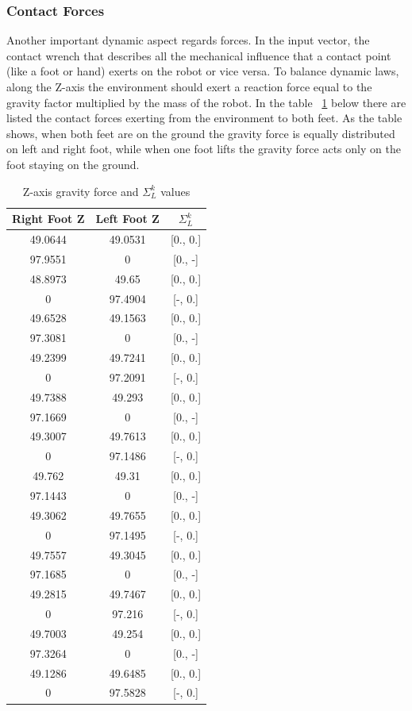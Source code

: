 \documentclass[main.tex]{subfiles}
\begin{document}
\subsubsection{Contact Forces}
Another important dynamic aspect regards forces. 
In the input vector, the contact wrench that describes all the mechanical influence that a contact point (like a foot or hand) exerts on the robot or vice versa.
To balance dynamic laws, along the Z-axis the environment should exert a reaction force equal to the gravity factor multiplied by the mass of the robot. In the table ~\ref{tab:contact_forces_walking}  below there are listed the contact forces exerting from the environment to both feet. As the table shows, when both feet are on the ground the gravity force is equally distributed on left and right foot, while when one foot lifts the gravity force acts only on the foot staying on the ground.
\begin{table}[H]
\label{tab:contact_forces_walking}
\centering
\begin{tabular}{ccc}
\toprule
Right Foot Z & Left Foot Z & $\Sigma_L^k$ \\
\midrule
49.0644 & 49.0531 & [0., 0.] \\
97.9551 & 0 & [0., -] \\
48.8973 & 49.65 & [0., 0.] \\
0 & 97.4904 & [-, 0.] \\
49.6528 & 49.1563 & [0., 0.] \\
97.3081 & 0 & [0., -] \\
49.2399 & 49.7241 & [0., 0.] \\
0 & 97.2091 & [-, 0.] \\
49.7388 & 49.293 & [0., 0.] \\
97.1669 & 0 & [0., -] \\
49.3007 & 49.7613 & [0., 0.] \\
0 & 97.1486 & [-, 0.] \\
49.762 & 49.31 & [0., 0.] \\
97.1443 & 0 & [0., -] \\
49.3062 & 49.7655 & [0., 0.] \\
0 & 97.1495 & [-, 0.] \\
49.7557 & 49.3045 & [0., 0.] \\
97.1685 & 0 & [0., -] \\
49.2815 & 49.7467 & [0., 0.] \\
0 & 97.216 & [-, 0.] \\
49.7003 & 49.254 & [0., 0.] \\
97.3264 & 0 & [0., -] \\
49.1286 & 49.6485 & [0., 0.] \\
0 & 97.5828 & [-, 0.] \\
\bottomrule
\end{tabular}
\caption{Z-axis gravity force and $\Sigma_L^k$ values}
\end{table}
\end{document}
